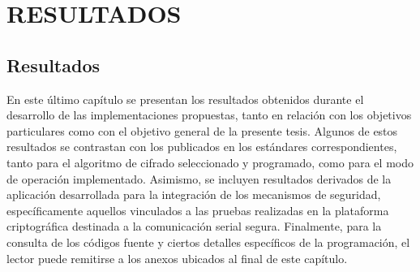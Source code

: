\chapter{RESULTADOS}

\section{Resultados}

En este último capítulo se presentan los resultados obtenidos durante el desarrollo de las implementaciones propuestas, tanto en relación con los objetivos particulares como con el objetivo general de la presente tesis. Algunos de estos resultados se contrastan con los publicados en los estándares correspondientes, tanto para el algoritmo de cifrado seleccionado y programado, como para el modo de operación implementado. Asimismo, se incluyen resultados derivados de la aplicación desarrollada para la integración de los mecanismos de seguridad, específicamente aquellos vinculados a las pruebas realizadas en la plataforma criptográfica destinada a la comunicación serial segura. Finalmente, para la consulta de los códigos fuente y ciertos detalles específicos de la programación, el lector puede remitirse a los anexos ubicados al final de este capítulo.





\endinput 